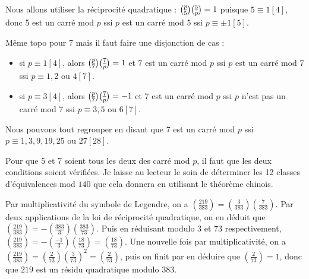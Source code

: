 \begin{sol}
Nous allons utiliser la r\'eciprocit\'e quadratique : ${p\overwithdelims () 5}{5\overwithdelims () p}=1$ puisque $5\equiv 1[4]$, donc 5 est un carr\'e mod $p$ ssi $p$ est un carr\'e mod 5 ssi $p\equiv \pm 1[5]$.

M\^eme topo pour 7 mais il faut faire une disjonction de cas : \begin{itemize}
\item si $p\equiv 1[4]$, alors ${p\overwithdelims () 7}{7\overwithdelims () p}=1$ et 7 est un carr\'e mod $p$ ssi $p$ est un carr\'e mod 7 ssi $p\equiv 1,2$ ou $4[7]$.
\item si $p\equiv 3[4]$, alors ${p\overwithdelims () 7}{7\overwithdelims () p}=-1$ et 7 est un carr\'e mod $p$ ssi $p$ n'est pas un carr\'e mod 7 ssi $p\equiv 3,5$ ou $6[7]$.\end{itemize}
Nous pouvons tout regrouper en disant que 7 est un carr\'e mod $p$ ssi $p\equiv 1,3,9,19,25$ ou $27 [28]$.

Pour que 5 et 7 soient tous les deux des carr\'e mod $p$, il faut que les deux conditions soient v\'erifi\'ees. Je laisse au lecteur le soin de d\'eterminer les 12 classes d'\'equivalences mod $140$ que cela donnera en utilisant le th\'eor\`eme chinois.
\end{sol}

\begin{sol}

Par multiplicativit\'e du symbole de Legendre, on a $\displaystyle \left (\frac{219}{383} \right) = \left (\frac{3}{383} \right) \left (\frac{7}{383} \right)$. Par deux applications de la loi de r\'eciprocit\'e quadratique, on en d\'eduit que $\displaystyle \left (\frac{219}{383} \right) = - \left (\frac{383}{3} \right) \left (\frac{383}{73} \right)$. Puis en r\'eduisant modulo $3$ et $73$ respectivement, $\displaystyle \left (\frac{219}{383} \right) = - \left (\frac{-1}{3} \right) \left (\frac{18}{73} \right) = \left (\frac{18}{73} \right)$. Une nouvelle fois par multiplicativit\'e, on a $\displaystyle \left (\frac{219}{383} \right) = \left (\frac{2}{73} \right) \left (\frac{3}{73} \right)^2 = \left (\frac{2}{73} \right) $, puis on finit par en d\'eduire que $\displaystyle \left (\frac{2}{73} \right) = 1$, donc que $219$ est un r\'esidu quadratique modulo $383$.
\end{sol}


